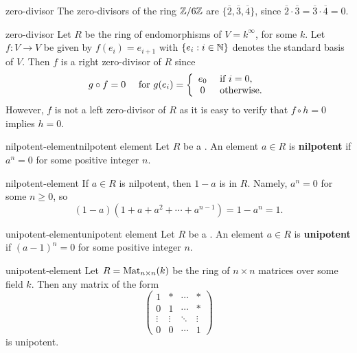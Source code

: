 \begin{example}{zero-divisor}
    The zero-divisors of the ring $\mathbb{Z} / 6 \mathbb{Z}$ are $\{ \overline{2}, \overline{3}, \overline{4} \}$, since $\overline{2} \cdot \overline{3} = \overline{3} \cdot \overline{4} = 0$.
\end{example}

\begin{example}{zero-divisor}
    Let $R$ be the ring of endomorphisms of $V = k^\infty$, for some  $k$. Let $f : V \to V$ be given by $f(e_i) = e_{i + 1}$ with $\{ e_i : i \in \mathbb{N} \}$ denotes the standard basis of $V$. Then $f$ is a right zero-divisor of $R$ since
    \[ g \circ f = 0 \quad \textup{ for }g(e_i) = \left\{ \begin{array}{cl} e_0 & \textup{ if } i = 0 , \\ 0 & \textup{ otherwise.} \end{array} \right. \]
    However, $f$ is not a left zero-divisor of $R$ as it is easy to verify that $f \circ h = 0$ implies $h = 0$.
\end{example}

\begin{topic}{nilpotent-element}{nilpotent element}
    Let $R$ be a . An element $a \in R$ is \textbf{nilpotent} if $a^n = 0$ for some positive integer $n$.
\end{topic}

\begin{example}{nilpotent-element}
    If $a \in R$ is nilpotent, then $1 - a$ is  in $R$. Namely, $a^n = 0$ for some $n \ge 0$, so
    \[ (1 - a) (1 + a + a^2 + \cdots + a^{n - 1}) = 1 - a^n = 1 . \]
\end{example}

\begin{topic}{unipotent-element}{unipotent element}
    Let $R$ be a . An element $a \in R$ is \textbf{unipotent} if $(a - 1)^n = 0$ for some positive integer $n$.
\end{topic}

\begin{example}{unipotent-element}
    Let $R = \textup{Mat}_{n \times n}(k)$ be the ring of $n \times n$ matrices over some field $k$. Then any matrix of the form
    \[ \begin{pmatrix} 1 & * & \cdots & * \\ 0 & 1 & \cdots & * \\ \vdots & \vdots & \ddots & \vdots \\ 0 & 0 & \cdots & 1 \end{pmatrix} \]
    is unipotent.
\end{example}

